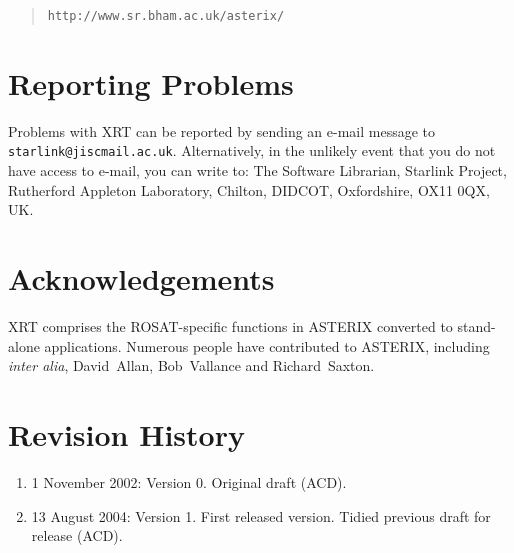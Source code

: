 \documentclass[twoside,11pt]{article}
\newcommand{\htmladdnormallink}[2]{#1}
\newcommand{\xlabel}[1]{}
\renewcommand{\_}{\texttt{\symbol{95}}}
\begin{document}
\begin{quote}
\htmladdnormallink{{\tt http://www.sr.bham.ac.uk/asterix/}}
{http://www.sr.bham.ac.uk/asterix/}
\end{quote}


\section{\xlabel{PROBLEMS}\label{PROBLEMS}Reporting Problems}

Problems with XRT can be reported by sending an e-mail message to {\tt
starlink@jiscmail.ac.uk}.  Alternatively, in the unlikely event that you do not
have access to e-mail, you can write to: The Software Librarian, Starlink
Project, Rutherford Appleton Laboratory, Chilton, DIDCOT, Oxfordshire,
OX11 0QX, UK.


\section{\xlabel{ACK}\label{ACK}Acknowledgements}

XRT comprises the ROSAT-specific functions in ASTERIX converted to
stand-alone applications.  Numerous people have contributed to ASTERIX,
including {\it inter alia}, David~Allan, Bob~Vallance and Richard~Saxton.


\section{\xlabel{REV}\label{REV}Revision History}

\begin{enumerate}

  \item 1 November 2002: Version 0.  Original draft (ACD).

  \item 13 August 2004: Version 1.  First released version.  Tidied
   previous draft for release (ACD).

\end{enumerate}



\typeout{  }
\typeout{*****************************************************}
\typeout{  }
\typeout{  }
\typeout{*****************************************************}
\typeout{  }
\end{document}
